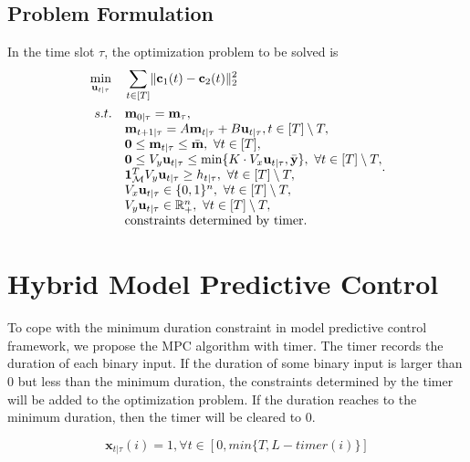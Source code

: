 \documentclass[english]{cccconf}
\begin{document}
\subsection{Problem Formulation}
In the time slot $\tau$, the optimization problem to be solved is 
\begin{equation}
\begin{aligned}
  &\min_{\textbf{u}_{t|\tau}} \quad \sum_{t\in[T]} \lVert \textbf{c}_1(t) - \textbf{c}_2(t)\rVert_2^{2}\\
  & \begin{array}{r@{\quad}l@{}l@{\quad}l}
  s.t.& \textbf{m}_{0|\tau} = \textbf{m}_{\tau},\\
  & \textbf{m}_{t+1|\tau} = A\textbf{m}_{t|\tau}+ B\textbf{u}_{t|\tau}, t \in [T]\setminus T,\\
  & \mathbf{0} \leq \mathbf{m}_{t|\tau} \leq \bar{\mathbf{m}}, ~\forall t \in [T],\\
  & \mathbf{0} \leq V_{y}\mathbf{u}_{t|\tau} \leq \min \{K\cdot V_{x}\mathbf{u}_{t|\tau},\bar{\textbf{y}}\}, ~\forall t \in [T]\setminus T,\\
  & \mathbf{1}_{\mathcal{M}}^TV_{y}\mathbf{u}_{t|\tau}\geq h_{t|\tau}, ~\forall t \in [T]\setminus T,\\
  & V_{x}\mathbf{u}_{t|\tau} \in \{0,1\}^{n},~\forall t \in [T]\setminus T,\\
  & V_{y}\mathbf{u}_{t|\tau}\in \mathbb{R}_{+}^{n},~\forall t \in [T]\setminus T,\\
  & \text{constraints determined by timer.}
\end{array}.
\end{aligned}
\end{equation}



\section{Hybrid Model Predictive Control}\label{sec:hybrid_mpc}

To cope with the minimum duration constraint in model predictive control framework, we propose the MPC algorithm with timer.
The timer records the duration of each binary input.
If the duration of some binary input is larger than 0 but less than the minimum duration, the constraints determined by the timer will be added to the optimization problem.
If the duration reaches to the minimum duration, then the timer will be cleared to 0.

\begin{equation}\label{eq:timer_constraint}
  \mathbf{x}_{t|\tau}(i) = 1, \forall t \in [0, min\{T, L-timer(i)\}]
\end{equation}
\end{document}
